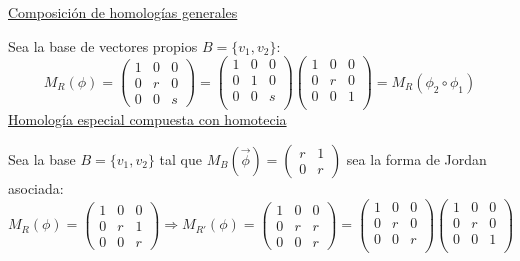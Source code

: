 \documentclass[10pt,a4paper,openright]{book}
\theoremstyle{break}
\begin{document}
\begin{itemize}
\underline{Composición de homologías generales}

Sea la base de vectores propios $B = \{v_1, v_2\}$:
$$M_R (\phi) = \left(\begin{array}{c|cc}
1  & 0 & 0 \\
\hline
0 & r &  0 \\
0 & 0 &  s
\end{array}
\right) = \begin{pmatrix} 1 & 0 & 0 \\ 0 & 1 & 0 \\ 0 & 0 & s \\

\end{pmatrix} \begin{pmatrix} 1 & 0 & 0 \\ 0 & r & 0 \\ 0 & 0 & 1 \\

\end{pmatrix} = M_R (\phi_2 \circ \phi_1)
$$
\underline{Homología especial compuesta con homotecia}

Sea la base $B = \{v_1, v_2\}$ tal que $M_B(\vec{\phi}) = \begin{pmatrix}
r & 1 \\ 0 & r
\end{pmatrix}$ sea la forma de Jordan asociada:
$$M_R (\phi) = \left(\begin{array}{c|cc}
1  & 0 & 0 \\
\hline
0 & r &  1 \\
0 & 0 &  r
\end{array}
\right) \Rightarrow M_{R'} (\phi) = \left(\begin{array}{c|cc}
1  & 0 & 0 \\
\hline
0 & r &  r \\
0 & 0 &  r
\end{array}
\right) = \begin{pmatrix} 1 & 0 & 0 \\ 0 & r & 0 \\ 0 & 0 & r \\

\end{pmatrix} \begin{pmatrix} 1 & 0 & 0 \\ 0 & r & 0 \\ 0 & 0 & 1 \\

\end{pmatrix}$$
\end{itemize}
\end{document}
